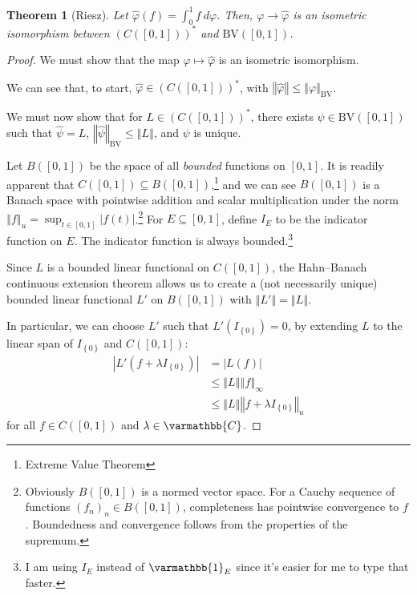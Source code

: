\documentclass[12pt]{extarticle}
\newcommand{\C}{\mathbb{C}}
\newcommand{\norm}[1]{\left\Vert #1\right\Vert}
\newcommand{\set}[1]{\left\{#1\right\}}
\theoremstyle{plain}
\newtheorem*{theorem}{Theorem}
\theoremstyle{definition}
\theoremstyle{note}
\renewcommand*{\mathbb}[1]{\varmathbb{#1}}
\renewcommand{\newline}{\hfill\break}
\begin{document}
\begin{theorem}[Riesz]
  Let $\hat{\varphi}(f) = \int_{0}^{1}f\:d\varphi$. Then, $\varphi \rightarrow \hat{\varphi}$ is an isometric isomorphism between $\left(C\left([0,1]\right)\right)^{\ast}$ and $\text{BV}\left([0,1]\right)$.
\end{theorem}
\begin{proof}
  We must show that the map $\varphi\mapsto \hat\varphi$ is an isometric isomorphism.\newline

  We can see that, to start, $\hat\varphi \in \left(C\left([0,1]\right)\right)^{\ast}$, with $\norm{\hat{\varphi}} \leq \norm{\varphi}_{\text{BV}}$.\newline

  We must now show that for $L\in \left(C\left([0,1]\right)\right)^{\ast}$, there exists $\psi \in \text{BV}\left([0,1]\right)$ such that $\hat{\psi} = L$, $\norm{\hat{\psi}}_{\text{BV}} \leq \norm{L}$, and $\psi$ is unique.\newline

  Let $B([0,1])$ be the space of all \textit{bounded} functions on $[0,1]$. It is readily apparent that $C([0,1])\subseteq B([0,1])$,\footnote{Extreme Value Theorem} and we can see $B([0,1])$ is a Banach space with pointwise addition and scalar multiplication under the norm $\norm{f}_{u} = \sup_{t\in [0,1]}\left\vert f(t) \right\vert$.\footnote{Obviously $B([0,1])$ is a normed vector space. For a Cauchy sequence of functions $(f_n)_n\in B([0,1])$, completeness has pointwise convergence to $f$. Boundedness and convergence follows from the properties of the supremum.} For $E\subseteq [0,1]$, define $I_{E}$ to be the indicator function on $E$. The indicator function is always bounded.\footnote{I am using $I_E$ instead of $\mathbb{1}_{E}$ since it's easier for me to type that faster.}\newline

  Since $L$ is a bounded linear functional on $C([0,1])$, the Hahn--Banach continuous extension theorem allows us to create a (not necessarily unique) bounded linear functional $L'$ on $B([0,1])$ with $\norm{L'} = \norm{L}$.\newline

  In particular, we can choose $L'$ such that $L'\left(I_{\set{0}}\right) = 0$, by extending $L$ to the linear span of $I_{\set{0}}$ and $C([0,1])$:
  \begin{align*}
    \left\vert L'\left(f + \lambda I_{\set{0}}\right) \right\vert &= \left\vert L(f) \right\vert\\
                                                                  &\leq \norm{L}\norm{f}_{\infty}\\
                                                                  &\leq \norm{L}\norm{f + \lambda I_{\set{0}}}_{u}
  \end{align*}
  for all $f\in C([0,1])$ and $\lambda \in \C$.\newline


\end{proof}
\end{document}
